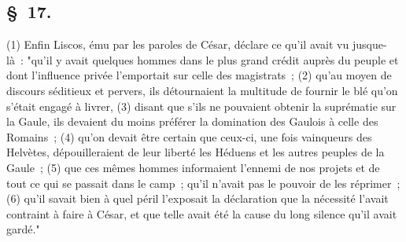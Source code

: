 \documentclass[french,twoside]{book} %
\begin{document}
\subsection[{§ 17.}]{ \textsc{§ 17.} }
\noindent (1) Enfin Liscos, ému par les paroles de César, déclare ce qu’il avait vu jusque-là : "qu’il y avait quelques hommes dans le plus grand crédit auprès du peuple et dont l’influence privée l’emportait sur celle des magistrats ; (2) qu’au moyen de discours séditieux et pervers, ils détournaient la multitude de fournir le blé qu’on s’était engagé à livrer, (3) disant que s’ils ne pouvaient obtenir la suprématie sur la Gaule, ils devaient du moins préférer la domination des Gaulois à celle des Romains ; (4) qu’on devait être certain que ceux-ci, une fois vainqueurs des Helvètes, dépouilleraient de leur liberté les Héduens et les autres peuples de la Gaule ; (5) que ces mêmes hommes informaient l’ennemi de nos projets et de tout ce qui se passait dans le camp ; qu’il n’avait pas le pouvoir de les réprimer ; (6) qu’il savait bien à quel péril l’exposait la déclaration que la nécessité l’avait contraint à faire à César, et que telle avait été la cause du long silence qu’il avait gardé."
\end{document}
